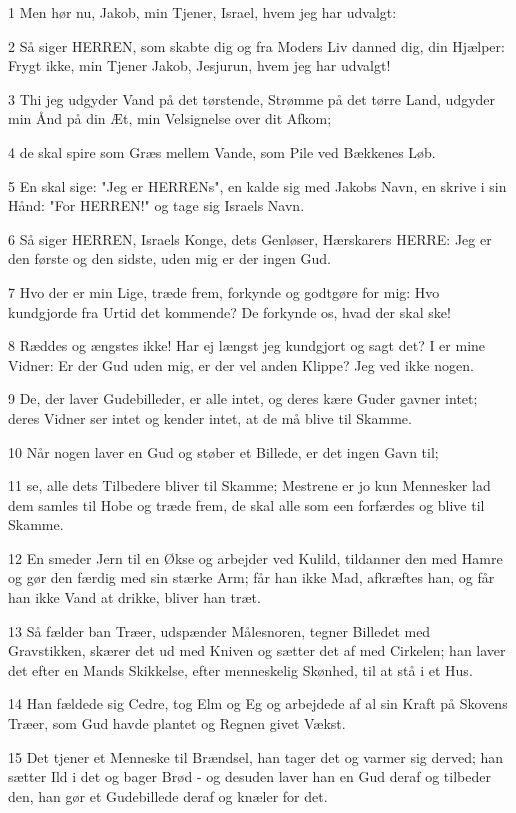 \par 1 Men hør nu, Jakob, min Tjener, Israel, hvem jeg har udvalgt:
\par 2 Så siger HERREN, som skabte dig og fra Moders Liv danned dig, din Hjælper: Frygt ikke, min Tjener Jakob, Jesjurun, hvem jeg har udvalgt!
\par 3 Thi jeg udgyder Vand på det tørstende, Strømme på det tørre Land, udgyder min Ånd på din Æt, min Velsignelse over dit Afkom;
\par 4 de skal spire som Græs mellem Vande, som Pile ved Bækkenes Løb.
\par 5 En skal sige: "Jeg er HERRENs", en kalde sig med Jakobs Navn, en skrive i sin Hånd: "For HERREN!" og tage sig Israels Navn.
\par 6 Så siger HERREN, Israels Konge, dets Genløser, Hærskarers HERRE: Jeg er den første og den sidste, uden mig er der ingen Gud.
\par 7 Hvo der er min Lige, træde frem, forkynde og godtgøre for mig: Hvo kundgjorde fra Urtid det kommende? De forkynde os, hvad der skal ske!
\par 8 Ræddes og ængstes ikke! Har ej længst jeg kundgjort og sagt det? I er mine Vidner: Er der Gud uden mig, er der vel anden Klippe? Jeg ved ikke nogen.
\par 9 De, der laver Gudebilleder, er alle intet, og deres kære Guder gavner intet; deres Vidner ser intet og kender intet, at de må blive til Skamme.
\par 10 Når nogen laver en Gud og støber et Billede, er det ingen Gavn til;
\par 11 se, alle dets Tilbedere bliver til Skamme; Mestrene er jo kun Mennesker lad dem samles til Hobe og træde frem, de skal alle som een forfærdes og blive til Skamme.
\par 12 En smeder Jern til en Økse og arbejder ved Kulild, tildanner den med Hamre og gør den færdig med sin stærke Arm; får han ikke Mad, afkræftes han, og får han ikke Vand at drikke, bliver han træt.
\par 13 Så fælder ban Træer, udspænder Målesnoren, tegner Billedet med Gravstikken, skærer det ud med Kniven og sætter det af med Cirkelen; han laver det efter en Mands Skikkelse, efter menneskelig Skønhed, til at stå i et Hus.
\par 14 Han fældede sig Cedre, tog Elm og Eg og arbejdede af al sin Kraft på Skovens Træer, som Gud havde plantet og Regnen givet Vækst.
\par 15 Det tjener et Menneske til Brændsel, han tager det og varmer sig derved; han sætter Ild i det og bager Brød - og desuden laver han en Gud deraf og tilbeder den, han gør et Gudebillede deraf og knæler for det.
